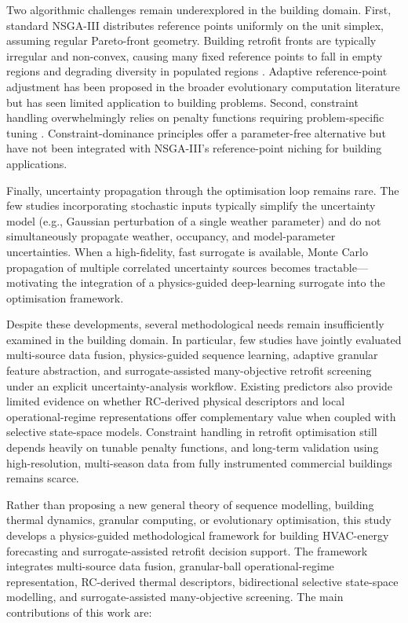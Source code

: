 \documentclass[11pt]{article}
\begin{document}
Two algorithmic challenges remain underexplored in the building domain. First, standard NSGA-III distributes reference points uniformly on the unit simplex, assuming regular Pareto-front geometry. Building retrofit fronts are typically irregular and non-convex, causing many fixed reference points to fall in empty regions and degrading diversity in populated regions \cite{53}. Adaptive reference-point adjustment has been proposed in the broader evolutionary computation literature \cite{54} but has seen limited application to building problems. Second, constraint handling overwhelmingly relies on penalty functions requiring problem-specific tuning \cite{55}. Constraint-dominance principles \cite{56} offer a parameter-free alternative but have not been integrated with NSGA-III's reference-point niching for building applications.

Finally, uncertainty propagation through the optimisation loop remains rare. The few studies incorporating stochastic inputs \cite{34,35,57} typically simplify the uncertainty model (e.g., Gaussian perturbation of a single weather parameter) and do not simultaneously propagate weather, occupancy, and model-parameter uncertainties. When a high-fidelity, fast surrogate is available, Monte Carlo propagation of multiple correlated uncertainty sources becomes tractable---motivating the integration of a physics-guided deep-learning surrogate into the optimisation framework.

Despite these developments, several methodological needs remain insufficiently examined in the building domain. In particular, few studies have jointly evaluated multi-source data fusion, physics-guided sequence learning, adaptive granular feature abstraction, and surrogate-assisted many-objective retrofit screening under an explicit uncertainty-analysis workflow. Existing predictors also provide limited evidence on whether RC-derived physical descriptors and local operational-regime representations offer complementary value when coupled with selective state-space models. Constraint handling in retrofit optimisation still depends heavily on tunable penalty functions, and long-term validation using high-resolution, multi-season data from fully instrumented commercial buildings remains scarce.

Rather than proposing a new general theory of sequence modelling, building thermal dynamics, granular computing, or evolutionary optimisation, this study develops a physics-guided methodological framework for building HVAC-energy forecasting and surrogate-assisted retrofit decision support. The framework integrates multi-source data fusion, granular-ball operational-regime representation, RC-derived thermal descriptors, bidirectional selective state-space modelling, and surrogate-assisted many-objective screening. The main contributions of this work are:
\end{document}
